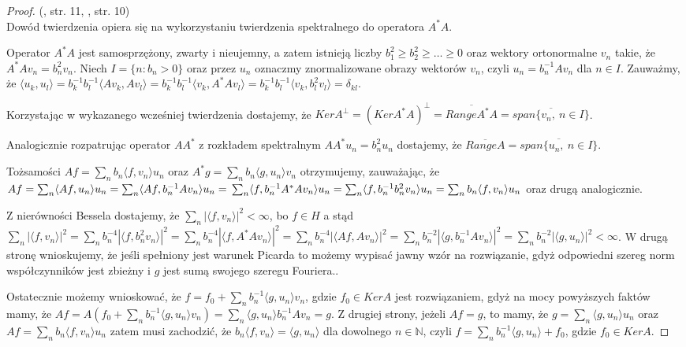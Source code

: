 \documentclass{mwart}
\begin{document}
\begin{proof}(\cite{kaipo}, str. 11, \cite{szkutnik}, str. 10)\\
Dowód twierdzenia opiera się na wykorzystaniu twierdzenia spektralnego do operatora $A^*A$.

Operator $A^*A$ jest samosprzężony, zwarty i nieujemny, a zatem istnieją liczby $b_1^2\geq b_2^2\geq\dots\geq 0$ oraz wektory ortonormalne $v_n$ takie, że $A^*Av_n=b_n^2v_n$. Niech $I=\{n\colon b_n>0\}$ oraz przez $u_n$ oznaczmy znormalizowane obrazy wektorów $v_n$, czyli $u_n=b_n^{-1}Av_n$ dla $n\in I$. Zauważmy, że $\langle u_k,u_l\rangle=b_k^{-1}b_l^{-1}\langle Av_k, Av_l\rangle=b_k^{-1}b_l^{-1}\langle v_k,A^*Av_l\rangle=b_k^{-1}b_l^{-1}\langle v_k,b_l^2v_l\rangle=\delta_{kl}$.

Korzystając w wykazanego wcześniej twierdzenia dostajemy, że $KerA^{\perp}=(KerA^*A)^{\perp}=\overline{RangeA^*A}=\overline{span\{v_n,\ n\in I\}}$.

Analogicznie rozpatrując operator $AA^*$ z rozkładem spektralnym $AA^*u_n=b_n^2u_n$ dostajemy, że $\overline{RangeA}=\overline{span\{u_n,\ n\in I\}}$.

Tożsamości $Af=\sum_nb_n\langle f, v_n\rangle u_n$ oraz $A^*g=\sum_nb_n\langle g, u_n\rangle v_n$ otrzymujemy, zauważając, że
$Af=\sum_n\langle Af,u_n\rangle u_n=\sum_n\langle Af, b_n^{-1}Av_n\rangle u_n=\\ \sum_n\langle f,b_n^{-1}A^*Av_n\rangle u_n=\sum_n\langle f,b_n^{-1}b_n^2v_n\rangle u_n=\sum_n b_n\langle f,v_n\rangle u_n$ oraz drugą analogicznie.

Z nierówności Bessela dostajemy, że $\sum_n|\langle f, v_n\rangle |^2<\infty$, bo $f\in H$ a stąd
$\sum_n|\langle f,v_n\rangle|^2=\sum_nb_n^{-4}|\langle f,b_n^2v_n\rangle|^2=\sum_nb_n^{-4}|\langle f, A^*Av_n\rangle|^2=\sum_nb_n^{-4}|\langle Af,Av_n\rangle|^2=\sum_nb_n^{-2}|\langle g, b_n^{-1}Av_n\rangle|^2=\sum_nb_n^{-2}|\langle g, u_n\rangle|^2<\infty$. W drugą stronę wnioskujemy, że jeśli spełniony jest warunek Picarda to możemy wypisać jawny wzór na rozwiązanie,  gdyż odpowiedni szereg norm współczynników jest zbieżny i $g$ jest sumą swojego szeregu Fouriera..

Ostatecznie możemy wnioskować, że $f=f_0+\sum_nb_n^{-1}\langle g, u_n\rangle v_n$, gdzie $f_0\in KerA$ jest rozwiązaniem, gdyż na mocy powyższych faktów mamy, że $Af=A(f_0+\sum_nb_n^{-1}\langle g, u_n\rangle v_n)=\sum_n\langle g, u_n\rangle b_n^{-1}Av_n=g$. Z drugiej strony, jeżeli $Af=g$, to mamy, że $g=\sum_n\langle g, u_n\rangle u_n$ oraz $Af=\sum_n b_n\langle f, v_n\rangle u_n$ zatem musi zachodzić, że $b_n\langle f, v_n\rangle = \langle g,u_n\rangle $ dla dowolnego $n\in \mathbb{N}$, czyli $f=\sum_n b_n^{-1}\langle g,u_n\rangle +f_0$, gdzie $f_0\in KerA$.
\end{proof}
\end{document}
